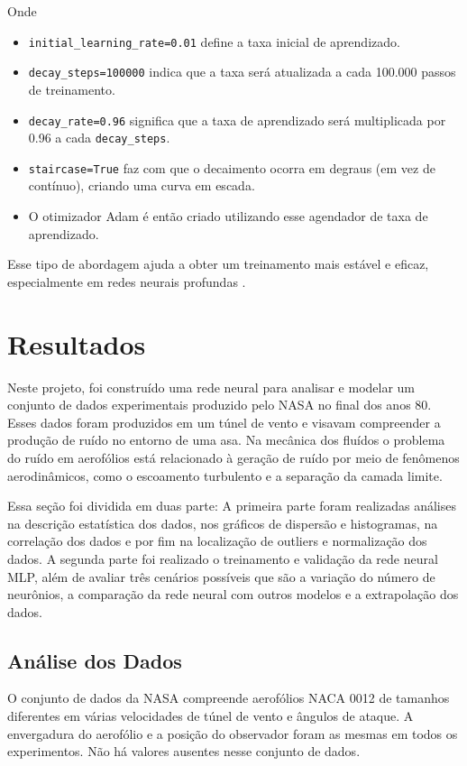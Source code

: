 \documentclass[12pt,a4paper,oneside]{report}
\begin{document}
Onde 
\begin{itemize}
	\item \texttt{initial\_learning\_rate=0.01} define a taxa inicial de aprendizado.
	\item \texttt{decay\_steps=100000} indica que a taxa será atualizada a cada 100.000 passos de treinamento.
	\item \texttt{decay\_rate=0.96} significa que a taxa de aprendizado será multiplicada por 0.96 a cada \texttt{decay\_steps}.
	\item \texttt{staircase=True} faz com que o decaimento ocorra em degraus (em vez de contínuo), criando uma curva em escada.
	\item O otimizador Adam é então criado utilizando esse agendador de taxa de aprendizado.
\end{itemize}

Esse tipo de abordagem ajuda a obter um treinamento mais estável e eficaz, especialmente em redes neurais profundas \cite{databricks:2024}.
	
	\chapter{Resultados}
	Neste projeto, foi construído uma rede neural para analisar e modelar um conjunto de dados experimentais produzido pelo NASA no final dos anos 80. Esses dados foram produzidos em um túnel de vento e visavam compreender a produção de ruído no entorno de uma asa. Na mecânica dos fluídos o problema do ruído em aerofólios está relacionado à geração de ruído por meio de fenômenos aerodinâmicos, como o escoamento turbulento e a separação da camada limite.
	
	Essa seção foi dividida em duas parte: A primeira parte foram realizadas análises  na descrição estatística dos dados, nos gráficos de dispersão e histogramas, na correlação dos dados e por fim na localização de outliers e normalização dos dados. A segunda parte foi realizado o treinamento e validação da rede neural MLP, além de avaliar três cenários possíveis que são a variação do número de neurônios, a comparação da rede neural com outros modelos e a extrapolação dos dados.
	
	\section{Análise dos Dados}
	
	O conjunto de dados da NASA compreende aerofólios NACA 0012 \cite{airfoil_self-noise_291} de tamanhos diferentes em várias velocidades de túnel de vento e ângulos de ataque. A envergadura do aerofólio e a posição do observador foram as mesmas em todos os experimentos. Não há valores ausentes nesse conjunto de dados.
	
\end{document}
